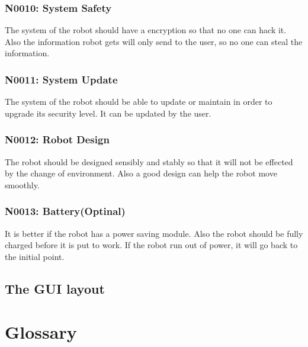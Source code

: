 \documentclass[11pt, a4paper]{report}
\begin{document}
\subsection{N0010: System Safety}
The system of the robot should have a encryption so that no one can hack it. Also the information robot gets will only send to the user, so no one can steal the information.


\subsection{N0011: System Update }
The system of the robot should be able to update or maintain in order to upgrade its security level. It can be updated by the user.


\subsection{N0012: Robot Design}
The robot should be designed sensibly and stably so that it will not be effected by the change of environment. Also a good design can help the robot move smoothly.


\subsection{N0013: Battery(Optinal)}
It is better if the robot has a power saving module. Also the robot should be fully charged before it is put to work. If the robot run out of power, it will go back to the initial point.


\section{The GUI layout}


\pagebreak

\newpage
\appendix

\pagebreak


\chapter{Glossary}
\end{document}
